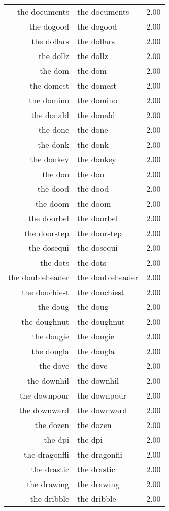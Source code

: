 \begin{table}[ht]
\begin{tabular}{rlr}
  the documents & the documents & 2.00 \\ 
  the dogood & the dogood & 2.00 \\ 
  the dollars & the dollars & 2.00 \\ 
  the dollz & the dollz & 2.00 \\ 
  the dom & the dom & 2.00 \\ 
  the domest & the domest & 2.00 \\ 
  the domino & the domino & 2.00 \\ 
  the donald & the donald & 2.00 \\ 
  the done & the done & 2.00 \\ 
  the donk & the donk & 2.00 \\ 
  the donkey & the donkey & 2.00 \\ 
  the doo & the doo & 2.00 \\ 
  the dood & the dood & 2.00 \\ 
  the doom & the doom & 2.00 \\ 
  the doorbel & the doorbel & 2.00 \\ 
  the doorstep & the doorstep & 2.00 \\ 
  the dosequi & the dosequi & 2.00 \\ 
  the dots & the dots & 2.00 \\ 
  the doubleheader & the doubleheader & 2.00 \\ 
  the douchiest & the douchiest & 2.00 \\ 
  the doug & the doug & 2.00 \\ 
  the doughnut & the doughnut & 2.00 \\ 
  the dougie & the dougie & 2.00 \\ 
  the dougla & the dougla & 2.00 \\ 
  the dove & the dove & 2.00 \\ 
  the downhil & the downhil & 2.00 \\ 
  the downpour & the downpour & 2.00 \\ 
  the downward & the downward & 2.00 \\ 
  the dozen & the dozen & 2.00 \\ 
  the dpi & the dpi & 2.00 \\ 
  the dragonfli & the dragonfli & 2.00 \\ 
  the drastic & the drastic & 2.00 \\ 
  the drawing & the drawing & 2.00 \\ 
  the dribble & the dribble & 2.00 \\ 

\end{tabular}
\end{table}
